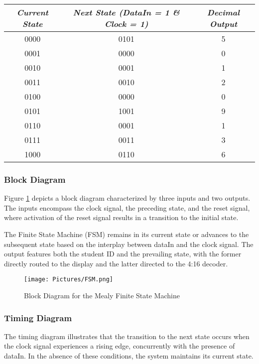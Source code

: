 		\begin{table}[H]
			\centering
			\begin{tabular}{|c|c|c|}
			\hline
			\hline
				\textit{Current State} & \textit{Next State (DataIn = 1 \& Clock = 1)} & \textit{Decimal Output} \\ 
				\hline
				\hline
				0000 & 0101 & 5 \\ \hline
				0001 & 0000 & 0 \\ \hline
				0010 & 0001 & 1 \\ \hline
				0011 & 0010 & 2 \\ \hline
				0100 & 0000 & 0 \\ \hline
				0101 & 1001 & 9 \\ \hline
				0110 & 0001 & 1 \\ \hline
				0111 & 0011 & 3 \\ \hline
				1000 & 0110 & 6 \\ \hline
			\hline
			\end{tabular}
		\end{table}
	
	\subsubsection{{Block Diagram}}
	
		{Figure \ref{FSM} depicts a block diagram characterized by three inputs and two outputs. The inputs encompass the clock signal, the preceding state, and the reset signal, where activation of the reset signal results in a transition to the initial state.}
		
		{The Finite State Machine (FSM) remains in its current state or advances to the subsequent state based on the interplay between dataIn and the clock signal. The output features both the student ID and the prevailing state, with the former directly routed to the display and the latter directed to the 4:16 decoder.}

		\begin{figure}[H]
			\centering
			\texttt{[image: Pictures/FSM.png]}
			\caption{{Block Diagram for the Mealy Finite State Machine}}
			\label{FSM}
		\end{figure}
	
	\subsubsection{{Timing Diagram}}
	
		{The timing diagram illustrates that the transition to the next state occurs when the clock signal experiences a rising edge, concurrently with the presence of dataIn. In the absence of these conditions, the system maintains its current state.}

